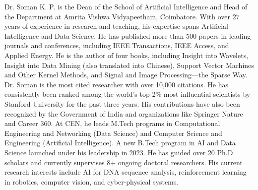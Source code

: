 Dr. Soman K. P. is the Dean of the School of Artificial Intelligence and Head of the Department at Amrita Vishwa Vidyapeetham, Coimbatore. With over 27 years of experience in research and teaching, his expertise spans Artificial Intelligence and Data Science. He has published more than 500 papers in leading journals and conferences, including IEEE Transactions, IEEE Access, and Applied Energy. He is the author of four books, including Insight into Wavelets, Insight into Data Mining (also translated into Chinese), Support Vector Machines and Other Kernel Methods, and Signal and Image Processing—the Sparse Way. Dr. Soman is the most cited researcher with over 10,000 citations. He has consistently been ranked among the world’s top 2\% most influential scientists by Stanford University for the past three years. His contributions have also been recognized by the Government of India and organizations like Springer Nature and Career 360. At CEN, he leads M.Tech programs in Computational Engineering and Networking (Data Science) and Computer Science and Engineering (Artificial Intelligence). A new B.Tech program in AI and Data Science launched under his leadership in 2023. He has guided over 20 Ph.D. scholars and currently supervises 8+ ongoing doctoral researchers. His current research interests include AI for DNA sequence analysis, reinforcement learning in robotics, computer vision, and cyber-physical systems.